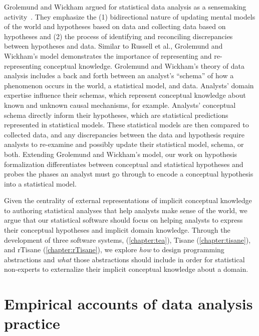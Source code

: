 Grolemund and Wickham argued for statistical data analysis as a sensemaking
activity~\cite{grolemund2014cognitive}. They emphasize the (1) bidirectional
nature of updating mental models of the world and hypotheses based on data and
collecting data based on hypotheses and (2) the process of identifying and
reconciling discrepancies between hypotheses and data. Similar to Russell et
al., Grolemund and Wickham's model demonstrates the importance of representing
and re-representing conceptual knowledge. Grolemund and Wickham's theory of data
analysis includes a back and forth between an analyst's ``schema'' of how a
phenomenon occurs in the world, a statistical model, and data. Analysts' domain
expertise influence their schemas, which represent conceptual knowledge about
known and unknown causal mechanisms, for example. Analysts' conceptual schema
directly inform their hypotheses, which are statistical predictions represented
in statistical models. These statistical models are then compared to collected
data, and any discrepancies between the data and hypothesis require analysts to
re-examine and possibly update their statistical model, schema, or both.
Extending Grolemund and Wickham's model, our work on hypothesis formalization
differentiates between conceptual and statistical hypotheses and probes the
phases an analyst must go through to encode a conceptual hypothesis into a
statistical model.

Given the centrality of external representations of implicit conceptual
knowledge to authoring statistical analyses that help analysts make sense of the
world, we argue that our statistical software should focus on helping analysts
to express their conceptual hypotheses and implicit domain knowledge. Through
the development of three software systems, \tea (\autoref{chapter:tea}),
Tisane (\autoref{chapter:tisane}), and rTisane (\autoref{chapter:rTisane}), we
explore \textit{how} to design programming abstractions and \textit{what} those
abstractions should include in order for statistical non-experts to externalize
their implicit conceptual knowledge about a domain. 

\section{Empirical accounts of data analysis practice}

